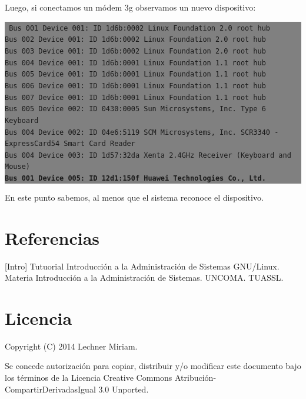 \documentclass[12pt]{article}
\begin{document}
Luego, si conectamos un módem 3g observamos un nuevo dispositivo: 

\colorbox{grey}{\parbox[t]{0.95\linewidth}{ \vspace*{0.5cm} { 
{\tt
Bus 001 Device 001: ID 1d6b:0002 Linux Foundation 2.0 root hub\\
Bus 002 Device 001: ID 1d6b:0002 Linux Foundation 2.0 root hub\\
Bus 003 Device 001: ID 1d6b:0002 Linux Foundation 2.0 root hub\\
Bus 004 Device 001: ID 1d6b:0001 Linux Foundation 1.1 root hub\\
Bus 005 Device 001: ID 1d6b:0001 Linux Foundation 1.1 root hub\\
Bus 006 Device 001: ID 1d6b:0001 Linux Foundation 1.1 root hub\\
Bus 007 Device 001: ID 1d6b:0001 Linux Foundation 1.1 root hub\\
Bus 005 Device 002: ID 0430:0005 Sun Microsystems, Inc. Type 6 Keyboard\\
Bus 004 Device 002: ID 04e6:5119 SCM Microsystems, Inc. SCR3340 - ExpressCard54 Smart Card Reader\\
Bus 004 Device 003: ID 1d57:32da Xenta 2.4GHz Receiver (Keyboard and Mouse)\\
\textbf{Bus 001 Device 005: ID 12d1:150f Huawei Technologies Co., Ltd.}
}
} \vspace*{0.5cm} } } 

En este punto sabemos, al menos que el sistema reconoce el dispositivo. 

\section*{Referencias}

[Intro] Tutuorial Introducción a la Administración de Sistemas GNU/Linux. Materia Introducción
a la Administración de Sistemas. UNCOMA. TUASSL. 

\section*{Licencia}

Copyright (C) 2014 Lechner Miriam.

Se concede autorización para copiar, distribuir y/o modificar este documento
bajo los términos de la Licencia Creative Commons Atribución-CompartirDerivadasIgual 3.0 Unported. 
\end{document}
